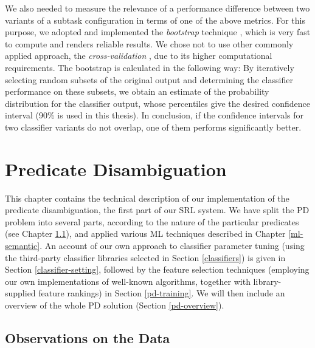 \documentclass[12pt,notitlepage]{report}
\begin{document}
We also needed to measure the relevance of a performance difference between two variants of a subtask configuration in terms of one of the above metrics. For this purpose, we adopted and implemented the \emph{bootstrap} technique \citep[p. 152]{efron79,witten05}, which is very fast to compute and renders reliable results. We chose not to use other commonly applied approach, the \emph{cross-validation} \citep[p. 241ff.]{hastie09}, due to its higher computational requirements.
The bootstrap is calculated in the following way: By iteratively selecting random subsets of the original output and determining the classifier performance on these subsets, we obtain an estimate of the probability distribution for the classifier output, whose percentiles give the desired confidence interval (90\% is used in this thesis). In conclusion, if the confidence intervals for two classifier variants do not overlap, one of them performs significantly better.

%
% 
\chapter{Predicate Disambiguation}\label{pd}
%
%

This chapter contains the technical description of our implementation of the predicate disambiguation, the first part of our SRL system. We have split the PD problem into several parts, according to the nature of the particular predicates (see Chapter \ref{pd-observe}), and applied various ML techniques described in Chapter \ref{ml-semantic}. An account of our own approach to classifier parameter tuning (using the third-party classifier libraries selected in Section \ref{classifiers}) is given in Section \ref{classifier-setting}, followed by the feature selection techniques (employing our own implementations of well-known algorithms, together with library-supplied feature rankings) in Section \ref{pd-training}. We will then include an overview of the whole PD solution (Section \ref{pd-overview}).

\section{Observations on the Data}\label{pd-observe}
\end{document}

